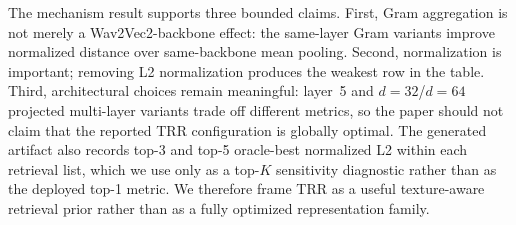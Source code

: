 \documentclass{article}
\begin{document}
\begin{table}[htbp]
	\centering
	\caption{Controlled TRR mechanism ablation on the P0 split using the current local execution path. Lower is better for Norm.L2; higher is better for all other metrics.}
	\label{tab:trr_mechanism_ablation}
	\small
\end{table}

The mechanism result supports three bounded claims. First, Gram aggregation is not merely a Wav2Vec2-backbone effect: the same-layer Gram variants improve normalized distance over same-backbone mean pooling. Second, normalization is important; removing L2 normalization produces the weakest row in the table. Third, architectural choices remain meaningful: layer~5 and $d=32$/$d=64$ projected multi-layer variants trade off different metrics, so the paper should not claim that the reported TRR configuration is globally optimal. The generated artifact also records top-3 and top-5 oracle-best normalized L2 within each retrieval list, which we use only as a top-$K$ sensitivity diagnostic rather than as the deployed top-1 metric. We therefore frame TRR as a useful texture-aware retrieval prior rather than as a fully optimized representation family.
\end{document}
